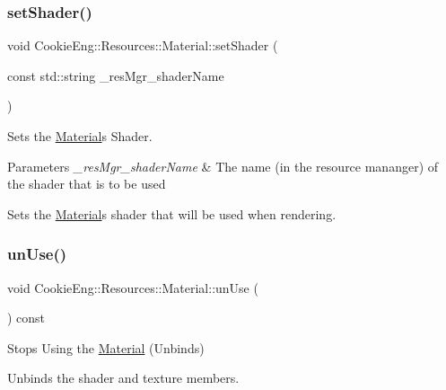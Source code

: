 \subsubsection{\texorpdfstring{set\+Shader()}{setShader()}}
{\footnotesize\ttfamily void Cookie\+Eng\+::\+Resources\+::\+Material\+::set\+Shader (\begin{DoxyParamCaption}\item[{const std\+::string}]{\+\_\+res\+Mgr\+\_\+shader\+Name }\end{DoxyParamCaption})}



Sets the \hyperlink{class_cookie_eng_1_1_resources_1_1_material}{Material}\textquotesingle{}s Shader. 


\begin{DoxyParams}{Parameters}
{\em \+\_\+res\+Mgr\+\_\+shader\+Name} & The name (in the resource mananger) of the shader that is to be used\\
\hline
\end{DoxyParams}
Sets the \hyperlink{class_cookie_eng_1_1_resources_1_1_material}{Material}\textquotesingle{}s shader that will be used when rendering. \mbox{\label{class_cookie_eng_1_1_resources_1_1_material_a7316b5a9dcc1b71b5090b5d54c7ac222}} 
\subsubsection{\texorpdfstring{un\+Use()}{unUse()}}
{\footnotesize\ttfamily void Cookie\+Eng\+::\+Resources\+::\+Material\+::un\+Use (\begin{DoxyParamCaption}{ }\end{DoxyParamCaption}) const}



Stops Using the \hyperlink{class_cookie_eng_1_1_resources_1_1_material}{Material} (Unbinds) 

Unbinds the shader and texture members. \mbox{\label{class_cookie_eng_1_1_resources_1_1_material_aeafea03fdfdaef5fb7be763e8948f416}} 
